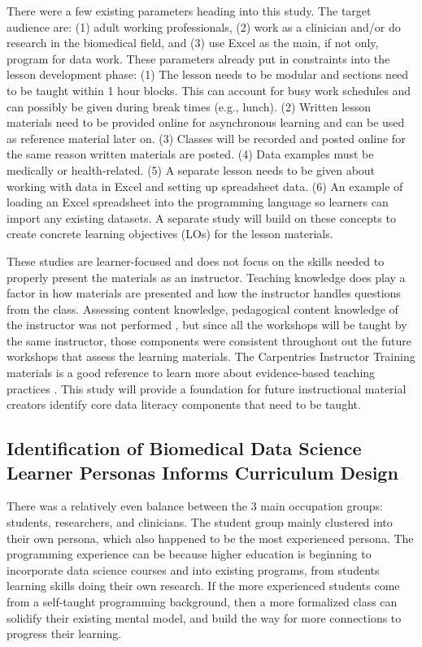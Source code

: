 \documentclass[020-persona\_validation.tex]{subfiles}
\begin{document}
    There were a few existing parameters heading into this study.
    The target audience are:
    (1) adult working professionals,
    (2) work as a clinician and/or do research in the biomedical field, and
    (3) use Excel as the main, if not only, program for data work.
    These parameters already put in constraints into the lesson development phase:
    (1) The lesson needs to be modular and sections need to be taught within 1 hour blocks.
    This can account for busy work schedules and can possibly be given during break times (e.g., lunch).
    (2) Written lesson materials need to be provided online for asynchronous learning and can be used as reference material later on.
    (3) Classes will be recorded and posted online for the same reason written materials are posted.
    (4) Data examples must be medically or health-related.
    (5) A separate lesson needs to be given about working with data in Excel and setting up spreadsheet data.
    (6) An example of loading an Excel spreadsheet into the programming language so learners can import any existing datasets.
    A separate study will build on these concepts to create concrete learning objectives (LOs) for the lesson materials.

    These studies are learner-focused and does not focus on the skills needed to properly present the materials as an instructor.
    Teaching knowledge does play a factor in how materials are presented and how the instructor handles questions from the class.
    Assessing content knowledge, pedagogical content knowledge of the instructor was not performed
    \cite{shulmanThoseWhoUnderstand1986},
    but since all the workshops will be taught by the same instructor, those components were consistent throughout out
    the future workshops that assess the learning materials.
    The Carpentries Instructor Training materials is a good reference to learn more about evidence-based teaching practices
    \cite{Koch2016}.
    This study will provide a foundation for future instructional material creators identify core data literacy components
    that need to be taught.

    \subsection{Identification of Biomedical Data Science Learner Personas Informs Curriculum Design}

        There was a relatively even balance between the 3 main occupation groups: students, researchers, and clinicians.
        The student group mainly clustered into their own persona,
        which also happened to be the most experienced persona.
        The programming experience can be because higher education is beginning to incorporate data science courses and
        into existing programs,
        from students learning skills doing their own research.
        If the more experienced students come from a self-taught programming background,
        then a more formalized class can solidify their existing mental model,
        and build the way for more connections to progress their learning.
\end{document}
